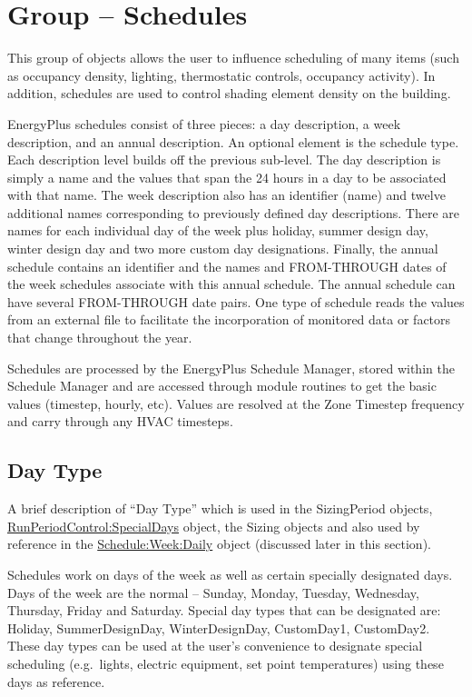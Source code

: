 \section{Group -- Schedules}\label{group-schedules}

This group of objects allows the user to influence scheduling of many items (such as occupancy density, lighting, thermostatic controls, occupancy activity). In addition, schedules are used to control shading element density on the building.

EnergyPlus schedules consist of three pieces: a day description, a week description, and an annual description. An optional element is the schedule type. Each description level builds off the previous sub-level. The day description is simply a name and the values that span the 24 hours in a day to be associated with that name. The week description also has an identifier (name) and twelve additional names corresponding to previously defined day descriptions. There are names for each individual day of the week plus holiday, summer design day, winter design day and two more custom day designations. Finally, the annual schedule contains an identifier and the names and FROM-THROUGH dates of the week schedules associate with this annual schedule. The annual schedule can have several FROM-THROUGH date pairs. One type of schedule reads the values from an external file to facilitate the incorporation of monitored data or factors that change throughout the year.

Schedules are processed by the EnergyPlus Schedule Manager, stored within the Schedule Manager and are accessed through module routines to get the basic values (timestep, hourly, etc). Values are resolved at the Zone Timestep frequency and carry through any HVAC timesteps.

\subsection{Day Type}\label{day-type}

A brief description of ``Day Type'' which is used in the SizingPeriod objects, \hyperref[runperiodcontrolspecialdays]{\hyperref[runperiod]{RunPeriod}Control:SpecialDays} object, the Sizing objects and also used by reference in the \hyperref[scheduleweekdaily]{Schedule:Week:Daily} object (discussed later in this section).

Schedules work on days of the week as well as certain specially designated days. Days of the week are the normal -- Sunday, Monday, Tuesday, Wednesday, Thursday, Friday and Saturday. Special day types that can be designated are: Holiday, SummerDesignDay, WinterDesignDay, CustomDay1, CustomDay2. These day types can be used at the user's convenience to designate special scheduling (e.g.~lights, electric equipment, set point temperatures) using these days as reference.

